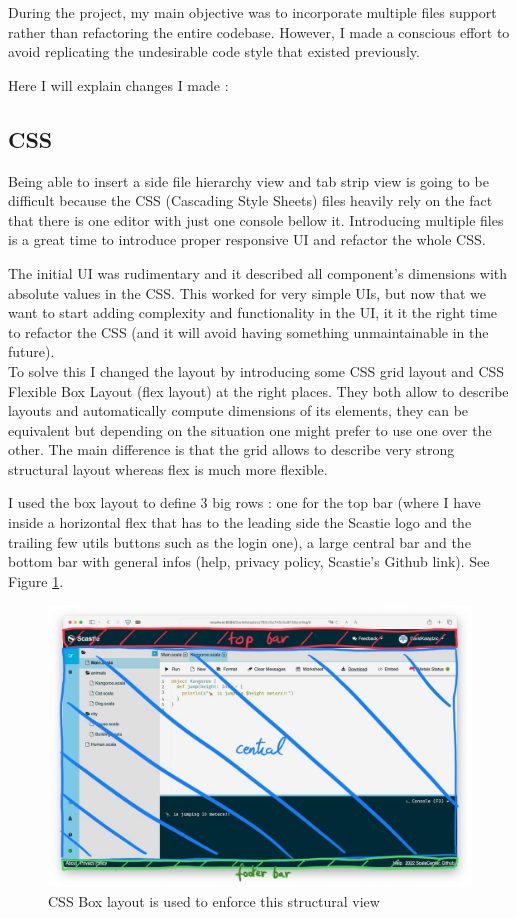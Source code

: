 \documentclass[a4paper,11pt,oneside]{report}
\begin{document}
During the project, my main objective was to incorporate multiple files support rather than refactoring the entire codebase. However, I made a conscious effort to avoid replicating the undesirable code style that existed previously.

Here I will explain changes I made :
\subsection{CSS}
Being able to insert a side file hierarchy view and tab strip view is going to be difficult because the CSS (Cascading Style Sheets) files heavily rely on the fact that there is one editor with just one console bellow it. Introducing multiple files is a great time to introduce proper responsive UI and refactor the whole CSS.

The initial UI was rudimentary and it described all component's dimensions with absolute values in the CSS. This worked for very simple UIs, but now that we want to start adding complexity and functionality in the UI, it it the right time to refactor the CSS (and it will avoid having something unmaintainable in the future).\\
To solve this I changed the layout by introducing some CSS grid layout and CSS Flexible Box Layout (flex layout) at the right places. They both allow to describe layouts and automatically compute dimensions of its elements, they can be equivalent but depending on the situation one might prefer to use one over the other. The main difference is that the grid allows to describe very strong structural layout whereas flex is much more flexible.


I used the box layout to define 3 big rows : one for the top bar (where I have inside a horizontal flex that has to the leading side the Scastie logo and the trailing few utils buttons such as the login one), a large central bar and the bottom bar with general infos (help, privacy policy, Scastie's Github link). See Figure \ref{grids}.

\begin{figure}[h]
\centering
\includegraphics[width=12cm]{main-grid.jpg}
\caption{CSS Box layout is used to enforce this structural view}
\label{grids}
\end{figure}
\end{document}
